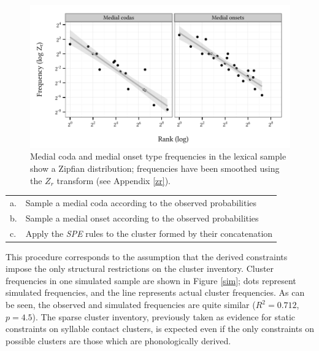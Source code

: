 \begin{figure}
\centering
\includegraphics{co.pdf}
\caption{Medial coda and medial onset type frequencies in the lexical sample show a Zipfian distribution; frequencies have been smoothed using the $Z_r$ transform (see Appendix \ref{zr}).}
\label{cao}
\end{figure}

\begin{example}
\begin{tabular}{l l}
a. & Sample a medial coda according to the observed probabilities  \\
b. & Sample a medial onset according to the observed probabilities \\
c. & Apply the \emph{SPE} rules to the cluster formed by their concatenation \\
\end{tabular}
\end{example}

This procedure corresponds to the assumption that the derived constraints impose the only structural restrictions on the cluster inventory.
Cluster frequencies in one simulated sample are shown in Figure \ref{sim}; dots represent simulated frequencies, and the line represents actual cluster frequencies.
As can be seen, the observed and simulated frequencies are quite similar 
($R^2 = 0.712$, $p = 4.5$).
The sparse cluster inventory, previously taken as evidence for static constraints on syllable contact clusters, is expected even if the only constraints on possible clusters are those which are phonologically derived.

